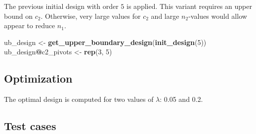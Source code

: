 \documentclass[
]{book}
\newenvironment{Shaded}{\begin{snugshade}}{\end{snugshade}}
\newcommand{\DataTypeTok}[1]{\textcolor[rgb]{0.13,0.29,0.53}{#1}}
\newcommand{\DecValTok}[1]{\textcolor[rgb]{0.00,0.00,0.81}{#1}}
\newcommand{\FloatTok}[1]{\textcolor[rgb]{0.00,0.00,0.81}{#1}}
\newcommand{\KeywordTok}[1]{\textcolor[rgb]{0.13,0.29,0.53}{\textbf{#1}}}
\newcommand{\NormalTok}[1]{#1}
\newcommand{\OperatorTok}[1]{\textcolor[rgb]{0.81,0.36,0.00}{\textbf{#1}}}
\newcommand{\StringTok}[1]{\textcolor[rgb]{0.31,0.60,0.02}{#1}}
\begin{document}
The previous initial design with order \(5\) is applied.
This variant requires an upper bound on \(c_2\).
Otherwise, very large values for \(c_2\) and large \(n_2\)-values would allow
appear to reduce \(n_1\).

\begin{Shaded}
\begin{Highlighting}[]
\NormalTok{ub_design <-}\StringTok{ }\KeywordTok{get_upper_boundary_design}\NormalTok{(}\KeywordTok{init_design}\NormalTok{(}\DecValTok{5}\NormalTok{))}
\NormalTok{ub_design}\OperatorTok{@}\NormalTok{c2_pivots <-}\StringTok{ }\KeywordTok{rep}\NormalTok{(}\DecValTok{3}\NormalTok{, }\DecValTok{5}\NormalTok{)}
\end{Highlighting}
\end{Shaded}

\hypertarget{optimization-11}{%
\subsection{Optimization}\label{optimization-11}}

The optimal design is computed for two values of \(\lambda\): 0.05 and 0.2.

\begin{Shaded}
\end{Shaded}

\hypertarget{test-cases-12}{%
\subsection{Test cases}\label{test-cases-12}}
\end{document}
